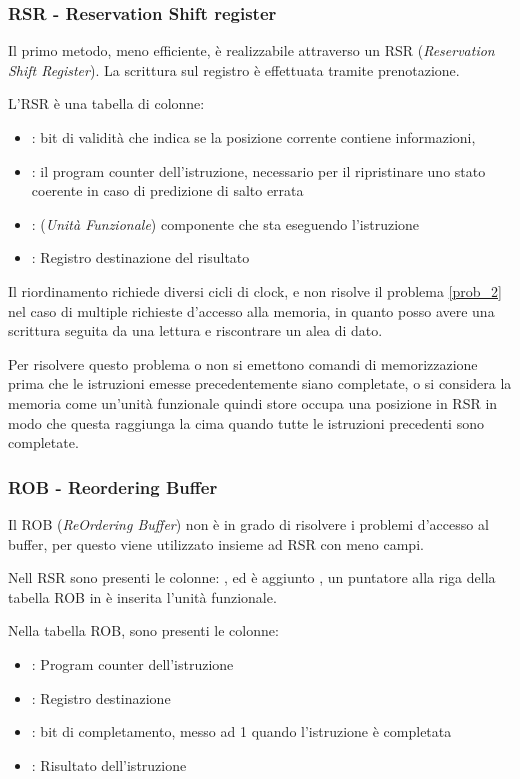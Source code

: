 \documentclass[../template]{subfiles}
\begin{document}
\subsubsection{RSR - Reservation Shift register}
Il primo metodo, meno efficiente, è realizzabile attraverso un RSR (\textit{Reservation Shift Register}).
La scrittura sul registro è effettuata tramite prenotazione.

L'RSR è una tabella di colonne:
\begin{itemize}
    \item {}: bit di validità che indica se la posizione corrente contiene informazioni,
    \item {}: il program counter dell'istruzione, necessario per il ripristinare uno stato coerente in caso di
        predizione di salto errata
    \item {}: (\textit{Unità Funzionale}) componente che sta eseguendo l'istruzione
    \item {}: Registro destinazione del risultato
\end{itemize}
Il riordinamento richiede diversi cicli di clock, e non risolve il problema \ref{prob_2} nel caso di multiple richieste d'accesso alla memoria,
in quanto posso avere una scrittura seguita da una lettura e riscontrare un alea di dato.

Per risolvere questo problema o non si emettono comandi di memorizzazione prima che le istruzioni emesse precedentemente
siano completate, o si considera la memoria come un'unità funzionale quindi store occupa una posizione in RSR in modo
che questa raggiunga la cima quando tutte le istruzioni precedenti sono completate.

\subsubsection{ROB - Reordering Buffer}
Il ROB (\textit{ReOrdering Buffer}) non è in grado di risolvere i problemi d'accesso al buffer, per questo viene utilizzato insieme ad RSR con meno campi.

Nell RSR sono presenti le colonne: ,  ed è aggiunto , un puntatore alla riga della tabella ROB in è inserita l'unità funzionale.

Nella tabella ROB, sono presenti le colonne:
\begin{itemize}
    \item {}: Program counter dell'istruzione
    \item {}: Registro destinazione
    \item {}: bit di completamento, messo ad 1 quando l'istruzione è completata
    \item {}: Risultato dell'istruzione
\end{itemize}
\end{document}
